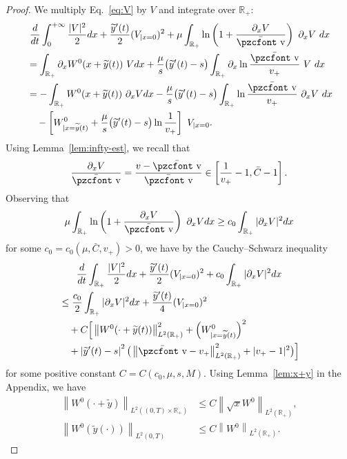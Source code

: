 \documentclass[10pt]{amsart}
\theoremstyle{definition}\newtheorem{defi}[theo]{Definition}\newtheorem{rema}[theo]{Remark}\newtheorem{exam}[theo]{Example}\newtheorem{exem}[theo]{Example}\newtheorem{nota}[theo]{Notation}
\newcommand{\mathpzc}[1]{\text{\pzcfont #1}}
\newcommand{\R}{\mathbb{R}}
\newcommand{\p}{\partial}
\newcommand{\bv}{\bar{\mathpzc{v}}}
\newcommand{\ty}{\widetilde{y}}
\begin{document}
\begin{proof}
We multiply Eq.~\eqref{eq:V} by $V$ and integrate over $\R_+$:
\begin{multline*}
\dfrac{d}{dt} \int_0^{+\infty} \dfrac{|V|^2}{2} dx + \dfrac{\ty'(t)}{2} (V_{|x=0})^2 + \mu \int_{\R_+} \ln \left(1 + \dfrac{\partial_x V}{\bv} \right) \ \partial_x V \ dx \\
\begin{aligned}
& = \int_{\R_+} \p_x W^0(x+\ty(t)) \ V dx + \dfrac{\mu}{s} \big(\ty'(t)-s\big) \int_{\R_+} \partial_x \ln \dfrac{\bv}{v_+}\ V \ dx \\
& = - \int_{\R_+} W^{0}(x + \ty(t)) \ \partial_x V dx - \dfrac{\mu}{s} \big(\ty'(t)-s\big) \int_{\R_+} \ln \dfrac{\bv}{v_+}\ \partial_x V \ dx \\
& \quad - \left[W^{0}_{|x=\ty(t)} + \dfrac{\mu}{s} \big(\ty'(t)-s\big) \ln \dfrac{1}{v_+}\right] \ V_{|x=0}.
\end{aligned}
\end{multline*}
Using Lemma~\ref{lem:infty-est}, we recall that
\[
\frac{\p_x V}{\bv}=\frac{v-\bv}{\bv}\in \left[\frac{1}{v_+}-1, \bar C-1\right].
\]
Observing that
\[
\mu \int_{\R_+} \ln \left(1 + \dfrac{\partial_x V}{\bv} \right) \ \partial_x V dx
\geq c_0 \int_{\R_+} |\partial_x V|^{2} dx
\]
for some $c_0 = c_0(\mu,\bar C, v_+) > 0$, we have by the Cauchy--Schwarz inequality
\begin{multline*}
\dfrac{d}{dt} \int_{\R_+} \dfrac{|V|^2}{2} dx + \dfrac{\ty'(t)}{2} (V_{|x=0})^2 + c_0 \int_{\R_+} |\partial_x V|^{2} dx \\
\begin{aligned}
& \leq \dfrac{c_0}{2} \int_{\R_+} |\partial_x V|^{2} dx + \dfrac{\ty'(t)}{4} (V_{|x=0})^2 \\
& \quad + C \Big[\left\| W^{0}(\cdot + \ty(t))\right\|_{L^2(\R_+)}^2 + \left(W^{0}_{|x=\ty(t)}\right)^2\\
&\quad+ \left|\ty'(t)-s\right|^2 \big(\left\|\bv- v_+\right\|_{L^2(\R_+)}^2 + |v_+-1|^2 \big)
\Big]
\end{aligned}
\end{multline*}
for some positive constant $C = C(c_0, \mu,s, M)$. Using Lemma~\ref{lem:x+y} in the Appendix, we have
\begin{equation}\label{eq:W0-L2}
\begin{aligned}
\left\| W^{0}(\cdot + \ty)\right\|_{L^2((0,T)\times\R_+)} &\leq C\left\|\sqrt{x} W^0\right\|_{L^2(\R_+)},\\
\left\| W^{0}(\ty(\cdot))\right\|_{L^2(0,T)} &\leq C\left\| W^0\right\|_{L^2(\R_+)}.

\end{aligned}
\end{equation}
\end{proof}
\end{document}

